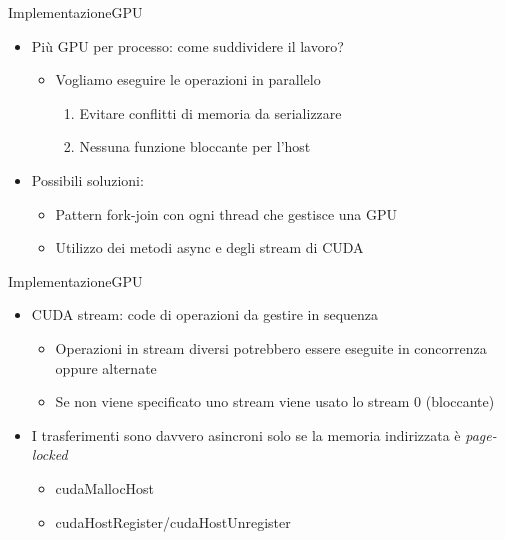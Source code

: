 \documentclass{beamer}
\begin{document}
\begin{frame}{Implementazione}{GPU}
    \begin{itemize}
        \item Più GPU per processo: come suddividere il lavoro?
              \begin{itemize}
                  \item Vogliamo eseguire le operazioni in parallelo
                        \begin{enumerate}
                            \item Evitare conflitti di memoria da serializzare
                            \item Nessuna funzione bloccante per l'host
                        \end{enumerate}
              \end{itemize}
        \item Possibili soluzioni:
              \begin{itemize}
                  \item Pattern fork-join con ogni thread che gestisce una GPU
                  \item \alert{Utilizzo dei metodi async e degli stream di CUDA}
              \end{itemize}
    \end{itemize}
\end{frame}


\begin{frame}{Implementazione}{GPU}
    \begin{itemize}
        \item CUDA stream: code di operazioni da gestire in sequenza
              \begin{itemize}
                  \item Operazioni in stream diversi potrebbero essere eseguite in concorrenza oppure alternate
                  \item Se non viene specificato uno stream viene usato lo stream 0 (bloccante)
              \end{itemize}
        \item I trasferimenti sono davvero asincroni solo se la memoria indirizzata è \textit{page-locked}
              \begin{itemize}
                  \item cudaMallocHost
                  \item cudaHostRegister/cudaHostUnregister
              \end{itemize}
    \end{itemize}
\end{frame}
\end{document}
